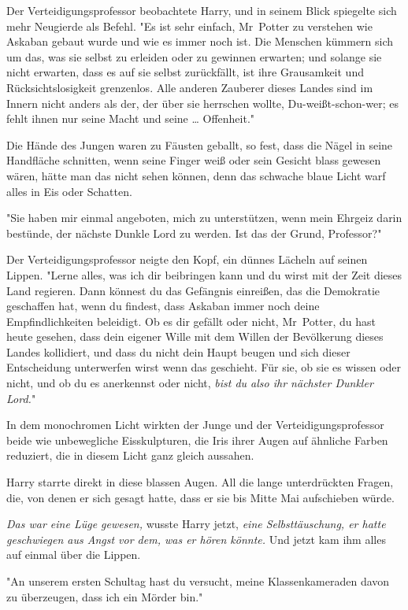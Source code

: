{Der Verteidigungsprofessor beobachtete Harry, und in seinem Blick spiegelte sich mehr Neugierde als Befehl. "Es ist sehr einfach, Mr~Potter zu verstehen wie Askaban gebaut wurde und wie es immer noch ist. Die Menschen kümmern sich um das, was sie selbst zu erleiden oder zu gewinnen erwarten; und solange sie nicht erwarten, dass es auf sie selbst zurückfällt, ist ihre Grausamkeit und Rücksichtslosigkeit grenzenlos. Alle anderen Zauberer dieses Landes sind im Innern nicht anders als der, der über sie herrschen wollte, Du-weißt-schon-wer; es fehlt ihnen nur seine Macht und seine … Offenheit."

Die Hände des Jungen waren zu Fäusten geballt, so fest, dass die Nägel in seine Handfläche schnitten, wenn seine Finger weiß oder sein Gesicht blass gewesen wären, hätte man das nicht sehen können, denn das schwache blaue Licht warf alles in Eis oder Schatten.

"Sie haben mir einmal angeboten, mich zu unterstützen, wenn mein Ehrgeiz darin bestünde, der nächste Dunkle Lord zu werden. Ist das der Grund, Professor?"

Der Verteidigungsprofessor neigte den Kopf, ein dünnes Lächeln auf seinen Lippen. "Lerne alles, was ich dir beibringen kann und du wirst mit der Zeit dieses Land regieren. Dann könnest du das Gefängnis einreißen, das die Demokratie geschaffen hat, wenn du findest, dass Askaban immer noch deine Empfindlichkeiten beleidigt. Ob es dir gefällt oder nicht, Mr~Potter, du hast heute gesehen, dass dein eigener Wille mit dem Willen der Bevölkerung dieses Landes kollidiert, und dass du nicht dein Haupt beugen und sich dieser Entscheidung unterwerfen wirst wenn das geschieht. Für sie, ob sie es wissen oder nicht, und ob du es anerkennst oder nicht, \emph{bist du also ihr nächster Dunkler Lord.}"

In dem monochromen Licht wirkten der Junge und der Verteidigungsprofessor beide wie unbewegliche Eisskulpturen, die Iris ihrer Augen auf ähnliche Farben reduziert, die in diesem Licht ganz gleich aussahen.

Harry starrte direkt in diese blassen Augen. All die lange unterdrückten Fragen, die, von denen er sich gesagt hatte, dass er sie bis Mitte Mai aufschieben würde.

\emph{Das war eine Lüge gewesen,} wusste Harry jetzt, \emph{eine Selbsttäuschung, er hatte geschwiegen aus Angst vor dem, was er hören könnte.} Und jetzt kam ihm alles auf einmal über die Lippen.

"An unserem ersten Schultag hast du versucht, meine Klassenkameraden davon zu überzeugen, dass ich ein Mörder bin."

}
